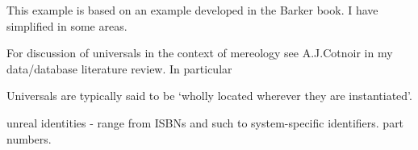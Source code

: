 {This example is based on an example developed in the Barker book. I have simplified in some areas.}


\begin{noteforfuture}
For discussion of universals in  the context of mereology see A.J.Cotnoir in my data/database literature review. In particular
\begin{erquote}
Universals are typically said to be ‘wholly located wherever they are instantiated’.
\end{erquote}
\end{noteforfuture}

\begin{noteforfuture}
unreal identities - range from ISBNs and such to system-specific identifiers. part numbers.
\end{noteforfuture}



 
